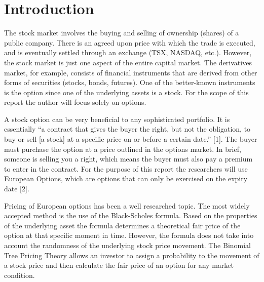 \documentclass[12pt]{article}
\begin{document}



\newpage 
\doublespacing
{}
\setlength{\parindent}{1cm}

\section{Introduction}
The stock market involves the buying and selling of ownership (shares) of a public company.  There is an agreed upon price with which the trade is executed, and is eventually settled through an exchange (TSX, NASDAQ, etc.).  However, the stock market is just one aspect of the entire capital market. The derivatives market, for example, consists of financial instruments that are derived from other forms of securities (stocks, bonds, futures).  One of the better-known instruments is the option since one of the underlying assets is a stock. For the scope of this report the author will focus solely on options.

A stock option can be very beneficial to any sophisticated portfolio. It is essentially “a contract that gives the buyer the right, but not the obligation, to buy or sell [a stock] at a specific price on or before a certain date.” [1]. The buyer must purchase the option at a price outlined in the options market. In brief, someone is selling you a right, which means the buyer must also pay a premium to enter in the contract. For the purpose of this report the researchers will use European Options, which are options that can only be exercised on the expiry date [2]. 

Pricing of European options has been a well researched topic. The most widely accepted method is the use of the Black-Scholes formula. Based on the properties of the underlying asset the formula determines a theoretical fair price of the option at that specific moment in time. However, the formula does not take into account the randomness of the underlying stock price movement. The Binomial Tree Pricing Theory allows an investor to assign a probability to the movement of a stock price and then calculate the fair price of an option for any market condition. 
\end{document}
